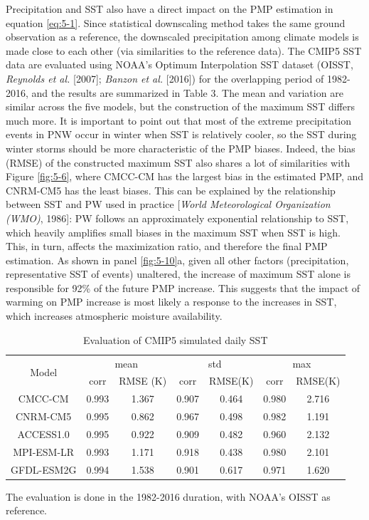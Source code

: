 Precipitation and SST also have a direct impact on the PMP estimation in equation \ref{eq:5-1}. Since statistical downscaling method takes the same ground observation as a reference, the downscaled precipitation among climate models is made close to each other (via similarities to the reference data). The CMIP5 SST data are evaluated using NOAA’s Optimum Interpolation SST dataset (OISST, \textit{Reynolds et al.} [2007]; \textit{Banzon et al.} [2016]) for the overlapping period of 1982-2016, and the results are summarized in Table 3. The mean and variation are similar across the five models, but the construction of the maximum SST differs much more. It is important to point out that most of the extreme precipitation events in PNW occur in winter when SST is relatively cooler, so the SST during winter storms should be more characteristic of the PMP biases. Indeed, the bias (RMSE) of the constructed maximum SST also shares a lot of similarities with Figure \ref{fig:5-6}, where CMCC-CM has the largest bias in the estimated PMP, and CNRM-CM5 has the least biases. This can be explained by the relationship between SST and PW used in practice [\textit{World Meteorological Organization (WMO)}, 1986]: PW follows an approximately exponential relationship to SST, which heavily amplifies small biases in the maximum SST when SST is high. This, in turn, affects the maximization ratio, and therefore the final PMP estimation. As shown in panel \ref{fig:5-10}a, given all other factors (precipitation, representative SST of events) unaltered, the increase of maximum SST alone is responsible for 92\% of the future PMP increase. This suggests that the impact of warming on PMP increase is most likely a response to the increases in SST, which increases atmospheric moisture availability.

\begin{table}[htbp]
	\centering
	\caption{Evaluation of CMIP5 simulated daily SST}
	\begin{threeparttable}
		\begin{tabular}{ccccccc}
			\hline
			\multirow{2}{*}{Model} & \multicolumn{2}{c}{mean} & \multicolumn{2}{c}{std} & \multicolumn{2}{c}{max} \\
			\cline{2-7}
			 & corr  & RMSE (K)  & corr  & RMSE(K)  & corr & RMSE(K) \\
			\hline
			CMCC-CM & 0.993 & 1.367 & 0.907 & 0.464 & 0.980 & 2.716\\
			CNRM-CM5 & 0.995 & 0.862 & 0.967 & 0.498 & 0.982 & 1.191\\
			ACCESS1.0 & 0.995 & 0.922 & 0.909 & 0.482 & 0.960 & 2.132\\
			MPI-ESM-LR & 0.993 & 1.171 & 0.918 & 0.438 & 0.980 & 2.101\\
			GFDL-ESM2G & 0.994 & 1.538 & 0.901 & 0.617 & 0.971 & 1.620\\
			\hline
		\end{tabular}
		\begin{tablenotes}
			\small
			\item The evaluation is done in the 1982-2016 duration, with NOAA’s OISST as reference.
		\end{tablenotes}
	\end{threeparttable}
	\label{table:5-3}
\end{table}


